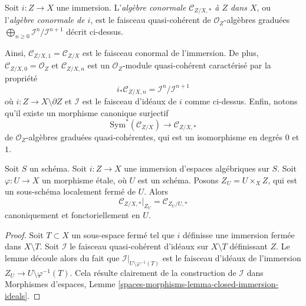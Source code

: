 \begin{definition}
\label{definition-conormal-algebra}
Soit $i : Z \to X$ une immersion. L'{\it algèbre conormale
$\mathcal{C}_{Z/X, *}$ à $Z$ dans $X$}, ou l'{\it algèbre conormale de $i$},
est le faisceau quasi-cohérent de $\mathcal{O}_Z$-algèbres graduées
$\bigoplus_{n \geq 0} \mathcal{I}^n/\mathcal{I}^{n + 1}$ décrit ci-dessus.
\end{definition}

\noindent
Ainsi, $\mathcal{C}_{Z/X, 1} = \mathcal{C}_{Z/X}$ est le faisceau conormal
de l'immersion. De plus, $\mathcal{C}_{Z/X, 0} = \mathcal{O}_Z$ et
$\mathcal{C}_{Z/X, n}$ est un $\mathcal{O}_Z$-module quasi-cohérent
caractérisé par la propriété
\begin{equation}
\label{equation-conormal-in-degree-n}
i_*\mathcal{C}_{Z/X, n} = \mathcal{I}^n/\mathcal{I}^{n + 1}
\end{equation}
où $i : Z \to X \setminus \partial Z$ et $\mathcal{I}$ est le faisceau d'idéaux
de $i$ comme ci-dessus. Enfin, notons qu'il existe un morphisme canonique surjectif
\begin{equation}
\label{equation-conormal-algebra-quotient}
\text{Sym}^*(\mathcal{C}_{Z/X}) \longrightarrow \mathcal{C}_{Z/X, *}
\end{equation}
de $\mathcal{O}_Z$-algèbres graduées quasi-cohérentes, qui est un isomorphisme
en degrés $0$ et $1$.

\begin{lemma}
\label{lemma-etale-conormal-algebra}
Soit $S$ un schéma. Soit $i : Z \to X$ une immersion d'espaces algébriques
sur $S$. Soit $\varphi : U \to X$ un morphisme étale, où $U$ est un
schéma. Posons $Z_U = U \times_X Z$, qui est un sous-schéma localement fermé de $U$.
Alors
$$
\mathcal{C}_{Z/X, *}|_{Z_U} = \mathcal{C}_{Z_U/U, *}
$$
canoniquement et fonctoriellement en $U$.
\end{lemma}

\begin{proof}
Soit $T \subset X$ un sous-espace fermé tel que $i$ définisse une immersion
fermée dans $X \setminus T$. Soit $\mathcal{I}$ le faisceau quasi-cohérent
d'idéaux sur $X \setminus T$ définissant $Z$. Le lemme découle alors
du fait que
$\mathcal{I}|_{U \setminus \varphi^{-1}(T)}$ est le faisceau d'idéaux de
l'immersion $Z_U \to U \setminus \varphi^{-1}(T)$.
Cela résulte clairement de la construction de $\mathcal{I}$ dans
Morphismes d'espaces, Lemme
\ref{spaces-morphisms-lemma-closed-immersion-ideals}.
\end{proof}

